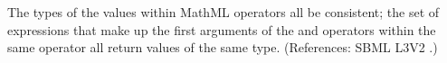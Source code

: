The types of the values within MathML  operators  all
be consistent; \ie the set of expressions that make up the first
arguments of the  and  operators within the
same  operator  all return values of the same type.
(References: SBML L3V2 .)
